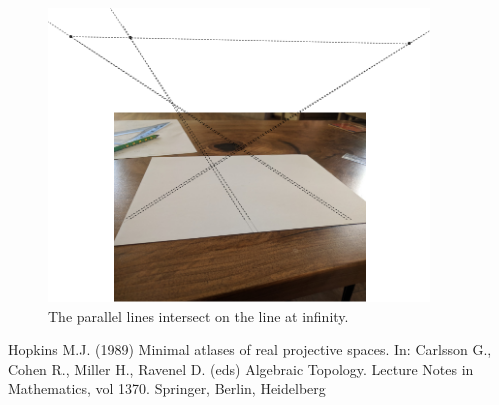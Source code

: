 \documentclass[a4paper,10pt]{article}
\begin{document}
\begin{figure}[h]
\centering
 \includegraphics[width=0.9\textwidth]{../../images/parallel.png}
 \caption{The parallel lines intersect on the line at infinity. }
 \label{fig:drawed}
\end{figure}

\begin{thebibliography}{1}
 Hopkins M.J. (1989) Minimal atlases of real projective spaces. In: Carlsson G., Cohen R., Miller H., Ravenel D. (eds) Algebraic Topology. Lecture Notes in Mathematics, vol 1370. Springer, Berlin, Heidelberg
\end{thebibliography}
\end{document}
